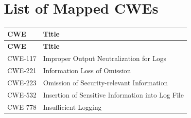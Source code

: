 \documentclass[11pt]{article}
\begin{document}
\newpage
\section{List of Mapped CWEs}
\renewcommand{\arraystretch}{1.1}
\begin{longtable}{@{}p{2.4cm}p{12.0cm}@{}}
\toprule
\textbf{CWE} & \textbf{Title} \\
\midrule
\endfirsthead
\toprule
\textbf{CWE} & \textbf{Title} \\
\midrule
\endhead
\bottomrule
\endfoot

CWE-117 & Improper Output Neutralization for Logs \\
CWE-221 & Information Loss of Omission \\
CWE-223 & Omission of Security-relevant Information \\
CWE-532 & Insertion of Sensitive Information into Log File \\
CWE-778 & Insufficient Logging \\

\end{longtable}
\end{document}
